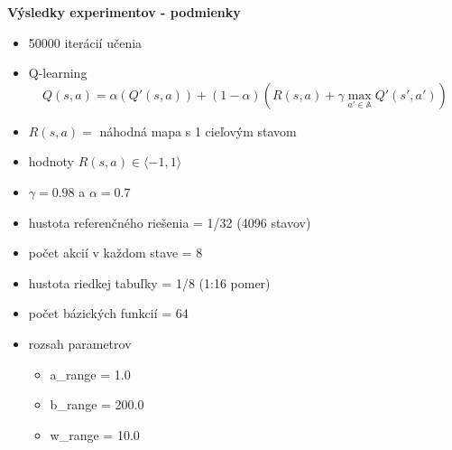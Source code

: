 \documentclass[xcolor=dvipsnames]{beamer}
\begin{document}
\begin{frame}{\bf Výsledky experimentov - podmienky}

\begin{itemize}
\item 50000 iterácií učenia
\item Q-learning
\begin{equation} \label{eu_eqn}
Q(s,a) = \alpha(Q'(s,a)) + (1 - \alpha)(R(s,a) + \gamma \max_{a' \in \mathbb{A}} Q'(s', a')) \nonumber
\end{equation}

\item $R(s, a) =$ náhodná mapa s 1 cieľovým stavom
\item hodnoty $R(s, a) \in \langle -1, 1 \rangle$
\item $\gamma = 0.98$ a $\alpha = 0.7$

\item hustota referenčného riešenia = 1/32  (4096 stavov)
\item počet akcií v každom stave = 8
\item hustota riedkej tabuľky = 1/8  (1:16 pomer)
\item počet bázických funkcií = 64
\item rozsah parametrov
    \begin{itemize}
      \item a\_range = 1.0
      \item b\_range = 200.0
      \item w\_range = 10.0
    \end{itemize}
\end{itemize}

\end{frame}
\end{document}
